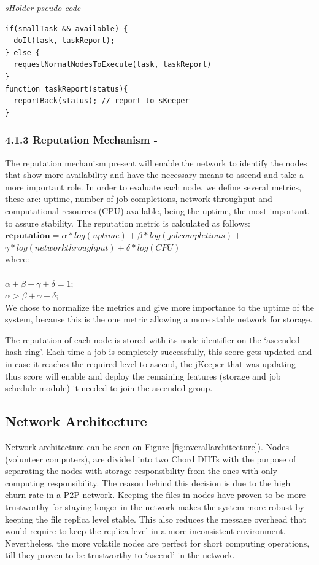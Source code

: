 \textit{sHolder pseudo-code}
\begingroup
\scriptsize
\begin{verbatim}
if(smallTask && available) {
  doIt(task, taskReport);
} else {
  requestNormalNodesToExecute(task, taskReport)
}
function taskReport(status){
  reportBack(status); // report to sKeeper
}
\end{verbatim}
\endgroup

\subsubsection{4.1.3 Reputation Mechanism -}


The reputation mechanism present will enable the network to identify the nodes that show more availability and have the necessary means to ascend and take a more important role. In order to evaluate each node, we define several metrics, these are: uptime, number of job completions, network throughput and computational resources (CPU) available, being the uptime, the most important, to assure stability. The reputation metric is calculated as follows: \\

$ \textbf{reputation} = \alpha * log(uptime) + \beta * log(job completions) + $ \\
$          \gamma * log(network throughput) + \delta * log (CPU)$
\\
where: \\
\\
  $\alpha+ \beta+ \gamma+ \delta = 1$; \\
  $\alpha > \beta + \gamma + \delta$;  \\

We chose to normalize the metrics and give more importance to the uptime of the system, because this is the one metric allowing a more stable network for storage.

The reputation of each node is stored with its node identifier on the `ascended hash ring'. Each time a job is completely successfully, this score gets updated and in case it reaches the required level to ascend, the jKeeper that was updating thus score will enable and deploy the remaining features (storage and job schedule module) it needed to join the ascended group. 

\subsection{Network Architecture}

Network architecture can be seen on Figure \ref{fig:overallarchitecture}). Nodes (volunteer computers), are divided into two Chord DHTs with the purpose of separating the nodes with storage responsibility from the ones with only computing responsibility. The reason behind this decision is due to the high churn rate in a P2P network. Keeping the files in nodes have proven to be more trustworthy for staying longer in the network makes the system more robust by keeping the file replica level stable. This also reduces the message overhead that would require to keep the replica level in a more inconsistent environment. Nevertheless, the more volatile nodes are perfect for short computing operations, till they proven to be trustworthy to `ascend' in the network.

